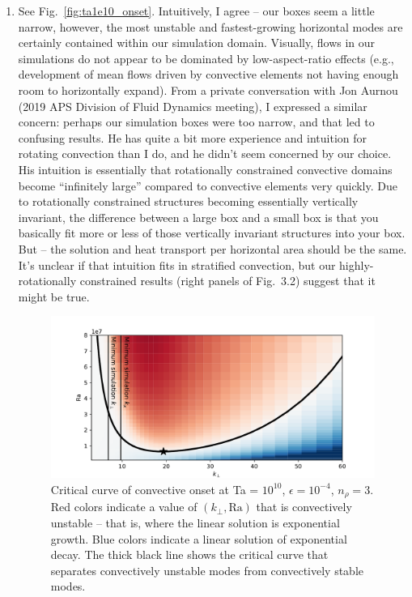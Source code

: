 \documentclass[aps, pre, onecolumn, nofootinbib, notitlepage, groupedaddress, amsfonts, amssymb, amsmath, longbibliography, superscriptaddress]{revtex4-1}
\begin{document}
\begin{enumerate}
\item See Fig.~\ref{fig:ta1e10_onset}. 
Intuitively, I agree -- our boxes seem a little narrow, however, the most unstable and fastest-growing horizontal modes are certainly contained within our simulation domain.
Visually, flows in our simulations do not appear to be dominated by low-aspect-ratio effects (e.g., development of mean flows driven by convective elements not having enough room to horizontally expand).
From a private conversation with Jon Aurnou (2019 APS Division of Fluid Dynamics meeting), I expressed a similar concern: perhaps our simulation boxes were too narrow, and that led to confusing results.
He has quite a bit more experience and intuition for rotating convection than I do, and he didn't seem concerned by our choice.
His intuition is essentially that rotationally constrained convective domains become ``infinitely large'' compared to convective elements very quickly.
Due to rotationally constrained structures becoming essentially vertically invariant, the difference between a large box and a small box is that you basically fit more or less of those vertically invariant structures into your box.
But -- the solution and heat transport per horizontal area should be the same.
It's unclear if that intuition fits in stratified convection, but our highly-rotationally constrained results (right panels of Fig.~3.2) suggest that it might be true.
\begin{figure}[t!]
\includegraphics[width=\textwidth]{./figs/crit_curve_ta1e10.pdf}
\caption{ 
	Critical curve of convective onset at Ta = $10^{10}$, $\epsilon = 10^{-4}$, $n_\rho = 3$.
	Red colors indicate a value of $(k_\perp, \text{Ra})$ that is convectively unstable -- that is, where the linear solution is exponential growth.
	Blue colors indicate a linear solution of exponential decay.
	The thick black line shows the critical curve that separates convectively unstable modes from convectively stable modes.
}
\end{figure}
\end{enumerate}
\end{document}

